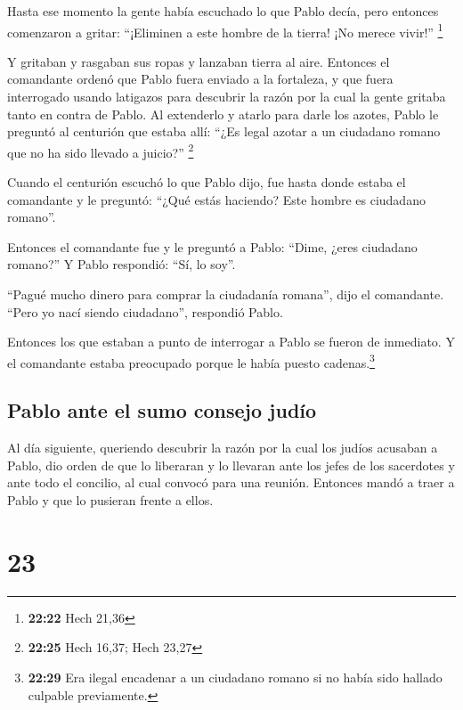  Hasta ese momento la gente había escuchado lo que Pablo
decía, pero entonces comenzaron a gritar: ``¡Eliminen a este hombre de
la tierra! ¡No merece vivir!'' \footnote{\textbf{22:22} Hech 21,36}

 Y gritaban y rasgaban sus ropas y lanzaban tierra al
aire.  Entonces el comandante ordenó que Pablo fuera
enviado a la fortaleza, y que fuera interrogado usando latigazos para
descubrir la razón por la cual la gente gritaba tanto en contra de
Pablo.  Al extenderlo y atarlo para darle los azotes,
Pablo le preguntó al centurión que estaba allí: ``¿Es legal azotar a un
ciudadano romano que no ha sido llevado a juicio?'' \footnote{\textbf{22:25}
  Hech 16,37; Hech 23,27}

 Cuando el centurión escuchó lo que Pablo dijo, fue hasta
donde estaba el comandante y le preguntó: ``¿Qué estás haciendo? Este
hombre es ciudadano romano''.

 Entonces el comandante fue y le preguntó a Pablo:
``Dime, ¿eres ciudadano romano?'' Y Pablo respondió: ``Sí, lo soy''.

 ``Pagué mucho dinero para comprar la ciudadanía
romana'', dijo el comandante. ``Pero yo nací siendo ciudadano'',
respondió Pablo.

 Entonces los que estaban a punto de interrogar a Pablo
se fueron de inmediato. Y el comandante estaba preocupado porque le
había puesto cadenas.\footnote{\textbf{22:29} Era ilegal encadenar a un
  ciudadano romano si no había sido hallado culpable previamente.}

\hypertarget{pablo-ante-el-sumo-consejo-juduxedo}{%
\subsection{Pablo ante el sumo consejo
judío}\label{pablo-ante-el-sumo-consejo-juduxedo}}

 Al día siguiente, queriendo descubrir la razón por la
cual los judíos acusaban a Pablo, dio orden de que lo liberaran y lo
llevaran ante los jefes de los sacerdotes y ante todo el concilio, al
cual convocó para una reunión. Entonces mandó a traer a Pablo y que lo
pusieran frente a ellos.

\hypertarget{section-22}{%
\section{23}\label{section-22}}

